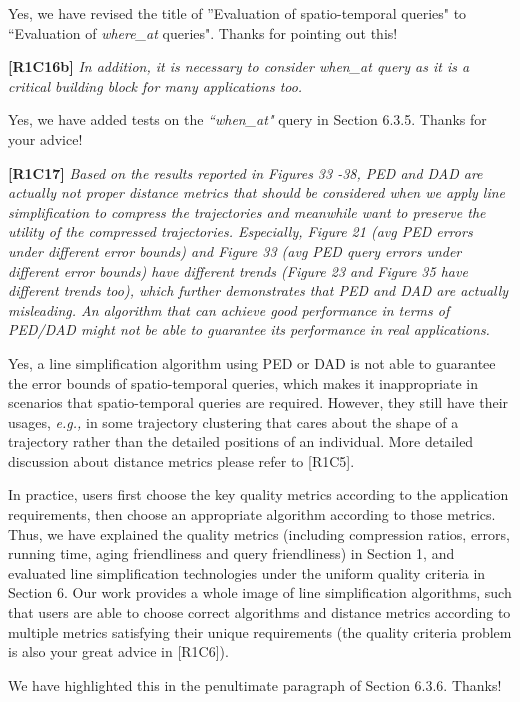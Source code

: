 \documentclass{letter}
\newcommand{\eg}{\emph{e.g.,}\xspace}
\begin{document}
{Yes, we have revised the title of ''Evaluation of spatio-temporal queries" to ``Evaluation of \emph{where\_at} queries". Thanks for pointing out this!

\textbf{[R1C16b]} \emph{In addition, it is necessary to consider \emph{when\_at} query as it is a critical building block for many applications too.} 

Yes, we have added tests on the \emph{``when\_at"} query in Section 6.3.5. Thanks for your advice!

\textbf{[R1C17]} \emph{ Based on the results reported in Figures 33 -38, PED and DAD are actually not proper distance metrics that should be considered when we apply line simplification to compress the trajectories and meanwhile want to preserve the utility of the compressed trajectories. Especially, Figure 21 (avg PED errors under different error bounds) and Figure 33 (avg PED query errors under different error bounds) have different trends (Figure 23 and Figure 35 have different trends too), which further demonstrates that PED and DAD are actually misleading. An algorithm that can achieve good performance in terms of PED/DAD might not be able to guarantee its performance in real applications. }

Yes, a line simplification algorithm using PED or DAD is not able to guarantee the error bounds of spatio-temporal queries, which makes it inappropriate in scenarios that spatio-temporal queries are required. However, they still have their usages, \eg in some trajectory clustering that cares about the shape of a trajectory rather than the detailed positions of an individual. More detailed discussion about distance metrics please refer to [R1C5].

In practice, users first choose the key quality metrics according to the application requirements, then choose an appropriate algorithm according to those metrics.
Thus, we have explained the quality metrics (including compression ratios, errors, running time, aging friendliness and query friendliness) in Section 1, and evaluated line simplification technologies under the uniform quality criteria in Section 6. Our work provides a whole image of line simplification algorithms, such that {users are able to choose correct algorithms and distance metrics} according to multiple metrics satisfying their unique requirements (the quality criteria problem is also your great advice in [R1C6]). 

We have highlighted this in the penultimate paragraph of Section 6.3.6.  
Thanks!

}
\end{document}
